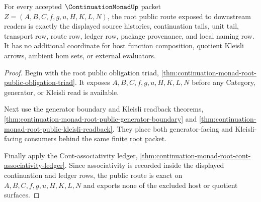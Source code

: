\begin{theorem}
\label{thm:continuation-monad-root-public-route-exactness}
For every accepted $\ContinuationMonadUp$ packet
$Z=(A,B,C,f,g,u,H,K,L,N)$, the root public route exposed to downstream readers
is exactly the displayed source histories, continuation tails, unit tail,
transport row, route row, ledger row, package provenance, and local naming row.
It has no additional coordinate for host function composition, quotient
Kleisli arrows, ambient hom sets, or external evaluators.
\end{theorem}
\begin{proof}
Begin with the root public obligation triad,
\autoref{thm:continuation-monad-root-public-obligation-triad}. It exposes
$A,B,C,f,g,u,H,K,L,N$ before any Category, generator, or Kleisli read is
available.

Next use the generator boundary and Kleisli readback theorems,
\autoref{thm:continuation-monad-root-public-generator-boundary} and
\autoref{thm:continuation-monad-root-public-kleisli-readback}. They place both
generator-facing and Kleisli-facing consumers behind the same finite root
packet.

Finally apply the Cont-associativity ledger,
\autoref{thm:continuation-monad-root-cont-associativity-ledger}. Since
associativity is recorded inside the displayed continuation and ledger rows,
the public route is exact on $A,B,C,f,g,u,H,K,L,N$ and exports none of the
excluded host or quotient surfaces.
\end{proof}

